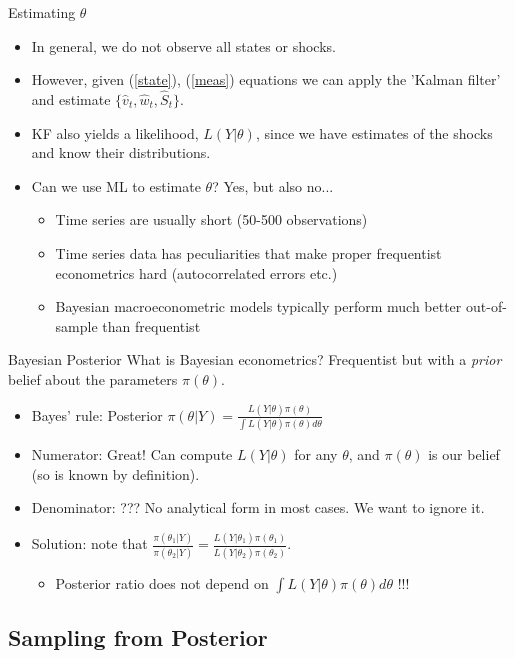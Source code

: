 \documentclass{beamer}
\begin{document}
\begin{frame}{Estimating $\theta$}
\begin{itemize}
\item In general, we do not observe all states or shocks.
\item However, given (\ref{state}), (\ref{meas}) equations we can apply the 'Kalman filter' and estimate $\{\hat{v}_t,\hat{w}_t,\hat{S}_t\}$.
\item KF also yields a likelihood, $L(Y|\theta)$, since we have estimates of the shocks and know their distributions.
\item Can we use ML to estimate $\theta$? Yes, but also no...
\begin{itemize}
\item Time series are usually short (50-500 observations)
\item Time series data has peculiarities that make proper frequentist econometrics hard (autocorrelated errors etc.)
\item Bayesian macroeconometric models typically perform much better out-of-sample than frequentist
\end{itemize}
\end{itemize}
\end{frame}


\begin{frame}{Bayesian Posterior}
What is Bayesian econometrics? Frequentist but with a \textit{prior} belief about the parameters $\pi(\theta).$
\begin{itemize}
\item Bayes' rule: Posterior $\pi(\theta|Y) = \frac{L(Y|\theta)\pi(\theta)}{\int L(Y|\theta)\pi(\theta)d\theta}$
\item Numerator: Great! Can compute $L(Y|\theta)$ for any $\theta$, and $\pi(\theta)$ is our belief (so is known by definition).
\item Denominator: ??? No analytical form in most cases. We want to ignore it.
\item Solution: note that $\frac{\pi(\theta_1|Y)}{\pi(\theta_2|Y)} = \frac{L(Y|\theta_1)\pi(\theta_1)}{L(Y|\theta_2)\pi(\theta_2)}$.
\begin{itemize}
\item Posterior ratio does not depend on $\int  L(Y|\theta)\pi(\theta)d\theta$ !!!
\end{itemize}
\end{itemize}
\end{frame}


\subsection{Sampling from Posterior}
\end{document}
